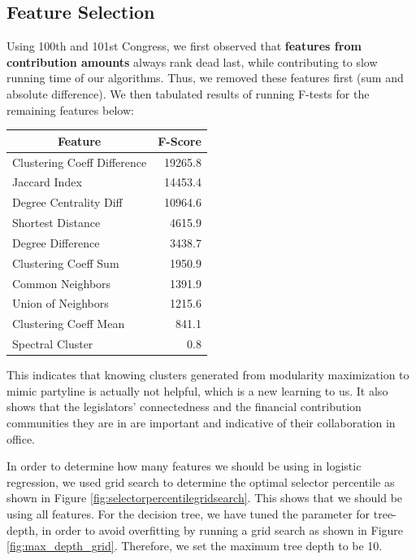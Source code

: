 \documentclass[12pt,twocolumn]{article}
\begin{document}
\subsection{Feature Selection}
Using 100th and 101st Congress, we first observed that \textbf{features from contribution amounts} always rank dead last, while contributing to slow running time of our algorithms. Thus, we removed these features first (sum and absolute difference). We then tabulated results of running F-tests for the remaining features below: 

\begin{tabular}{|l|r|}
\hline
\multicolumn{1}{|c|}{Feature} & \multicolumn{1}{c|}{F-Score} \\ \hline
Clustering Coeff Difference   & 19265.8                \\ \hline
Jaccard Index                      & 14453.4                        \\ \hline
Degree Centrality Diff                    & 10964.6                        \\ \hline
Shortest Distance            & 4615.9                    \\ \hline
Degree Difference                 & 3438.7                        \\ \hline
Clustering Coeff Sum                & 1950.9                        \\ \hline
Common Neighbors            & 1391.9                        \\ \hline
Union of Neighbors             & 1215.6                     \\ \hline
Clustering Coeff Mean              &  841.1             \\ \hline
Spectral Cluster          & 0.8                      \\ \hline
\end{tabular}

This indicates that knowing clusters generated from modularity maximization to mimic partyline is actually not helpful, which is a new learning to us. It also shows that the legislators' connectedness and the financial contribution communities they are in are important and indicative of their collaboration in office. 

In order to determine how many features we should be using in logistic regression, we used grid search to determine the optimal selector percentile as shown in Figure \ref{fig:selectorpercentilegridsearch}. This shows that we should be using all features. 
For the decision tree, we have tuned the parameter for tree-depth, in order to avoid overfitting by running a grid search as shown in Figure \ref{fig:max_depth_grid}. Therefore, we set the maximum tree depth to be 10. 
\end{document}
